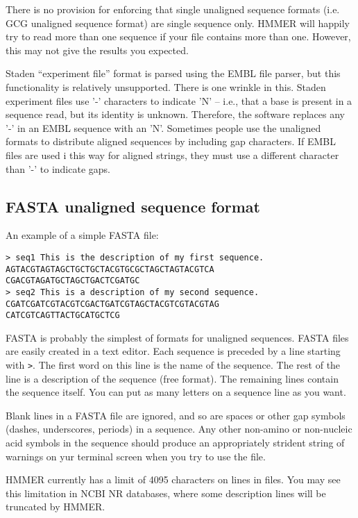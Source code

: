 There is no provision for enforcing that single unaligned sequence
formats (i.e. GCG unaligned sequence format) are single sequence
only. HMMER will happily try to read more than one sequence if your
file contains more than one. However, this may not give the results
you expected.

Staden ``experiment file'' format is parsed using the EMBL file
parser, but this functionality is relatively unsupported. There is one
wrinkle in this. Staden experiment files use '-' characters to
indicate 'N' -- i.e., that a base is present in a sequence read, but
its identity is unknown. Therefore, the software replaces any '-' in
an EMBL sequence with an 'N'. Sometimes people use the unaligned
formats to distribute aligned sequences by including gap
characters. If EMBL files are used i this way for aligned strings,
they must use a different character than '-' to indicate gaps.

\subsection{FASTA unaligned sequence format}

An example of a simple FASTA file: 

\begin{verbatim}
> seq1 This is the description of my first sequence.
AGTACGTAGTAGCTGCTGCTACGTGCGCTAGCTAGTACGTCA
CGACGTAGATGCTAGCTGACTCGATGC
> seq2 This is a description of my second sequence.
CGATCGATCGTACGTCGACTGATCGTAGCTACGTCGTACGTAG
CATCGTCAGTTACTGCATGCTCG
\end{verbatim}

FASTA is probably the simplest of formats for unaligned sequences.
FASTA files are easily created in a text editor.  Each sequence is
preceded by a line starting with \verb+>+. The first word on this line
is the name of the sequence. The rest of the line is a description of
the sequence (free format). The remaining lines contain the sequence
itself. You can put as many letters on a sequence line as you want.

Blank lines in a FASTA file are ignored, and so are spaces or other
gap symbols (dashes, underscores, periods) in a sequence. Any other
non-amino or non-nucleic acid symbols in the sequence should produce
an appropriately strident string of warnings on yur terminal screen
when you try to use the file.

HMMER currently has a limit of 4095 characters on lines in files.  You
may see this limitation in NCBI NR databases, where some description
lines will be truncated by HMMER. 

